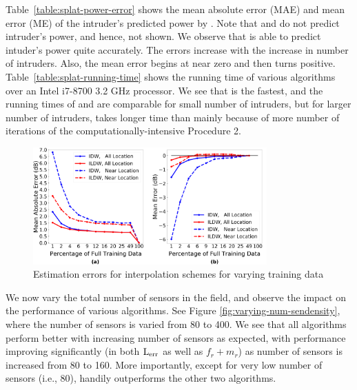 Table~\ref{table:splat-power-error} shows the mean absolute error
(MAE) and mean error (ME) of the intruder's predicted power by
\ouralgo. Note that \cl and \splot do not predict intruder's power,
and hence, not shown. We observe that \ouralgo is able to predict
intuder's power quite accurately. The errors increase with the increase in number of intruders. Also, the mean error begins at near zero and then turns positive. 
Table~\ref{table:splat-running-time} shows the running time of various
algorithms over an Intel i7-8700 3.2 GHz processor. We see that \cl is
the fastest, and the running times of \ouralgo and \splot are
comparable for small number of intruders, but for larger number of
intruders, \ouralgo takes longer time than \splot mainly because of
more number of iterations of the computationally-intensive Procedure
2.

\begin{figure}[ht]
	\centering
	\includegraphics[width=0.8\textwidth]{chapters/ipsn/figures/inter_error.png}
	\caption{Estimation errors for interpolation schemes for varying training data}
	\label{fig:inter-error}
\end{figure}

 We now vary the total number of sensors
in the field, and observe the impact on the performance of various
algorithms. See Figure \ref{fig:varying-num-sendensity}, where the
number of sensors is varied from 80 to 400. We see that all algorithms
perform better with increasing number of sensors as expected, with
\ouralgo performance improving significantly (in both $\mathrm{L_{err}}$ as well
as $f_r + m_r$) as number of sensors is increased from 80 to 160. More
importantly, except for very low number of sensors (i.e., 80),
\ouralgo handily outperforms the other two algorithms.


